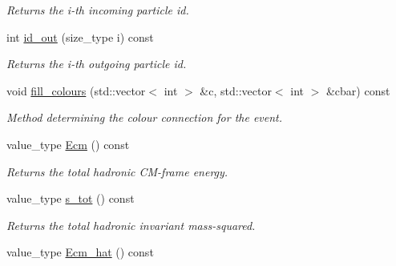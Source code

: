 \begin{DoxyCompactItemize}
\begin{DoxyCompactList}\small\item\em Returns the i-\/th incoming particle id. \end{DoxyCompactList}\item 
\hypertarget{a00436_a299283bf13ddd94d965b46b97da53453}{}int \hyperlink{a00436_a299283bf13ddd94d965b46b97da53453}{id\+\_\+out} (size\+\_\+type i) const \label{a00436_a299283bf13ddd94d965b46b97da53453}

\begin{DoxyCompactList}\small\item\em Returns the i-\/th outgoing particle id. \end{DoxyCompactList}\item 
\hypertarget{a00436_a54043a6b6773beba5cb69313b9b589de}{}void \hyperlink{a00436_a54043a6b6773beba5cb69313b9b589de}{fill\+\_\+colours} (std\+::vector$<$ int $>$ \&c, std\+::vector$<$ int $>$ \&cbar) const \label{a00436_a54043a6b6773beba5cb69313b9b589de}

\begin{DoxyCompactList}\small\item\em Method determining the colour connection for the event. \end{DoxyCompactList}\item 
\hypertarget{a00436_a4a9bd85b0a539cf576967af09fd62bf0}{}value\+\_\+type \hyperlink{a00436_a4a9bd85b0a539cf576967af09fd62bf0}{Ecm} () const \label{a00436_a4a9bd85b0a539cf576967af09fd62bf0}

\begin{DoxyCompactList}\small\item\em Returns the total hadronic C\+M-\/frame energy. \end{DoxyCompactList}\item 
\hypertarget{a00436_ac6e6f23d9fce776fe68c6e186053e4f2}{}value\+\_\+type \hyperlink{a00436_ac6e6f23d9fce776fe68c6e186053e4f2}{s\+\_\+tot} () const \label{a00436_ac6e6f23d9fce776fe68c6e186053e4f2}

\begin{DoxyCompactList}\small\item\em Returns the total hadronic invariant mass-\/squared. \end{DoxyCompactList}\item 
\hypertarget{a00436_a54c63596949efb310049f3e28d216fa6}{}value\+\_\+type \hyperlink{a00436_a54c63596949efb310049f3e28d216fa6}{Ecm\+\_\+hat} () const \label{a00436_a54c63596949efb310049f3e28d216fa6}


\end{DoxyCompactItemize}

